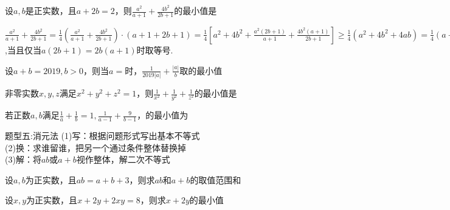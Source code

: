 \documentclass[11pt,a4paper]{ctexbook}
\begin{document}
\par
\begin{problem}
    设$a,b$是正实数，且$a+2b=2$，则$\displaystyle \frac{a^2}{a+1}+\frac{4b^2}{2b+1}$的最小值是
    \begin{jiexi}
        $\displaystyle \frac{a^2}{a+1}+\frac{4b^2}{2b+1}=\frac{1}{4}(\frac{a^2}{a+1}+\frac{4b^2}{2b+1})\cdot(a+1+2b+1)=
        \frac{1}{4}[a^2+4b^2+\frac{a^2(2b+1)}{a+1}+\frac{4b^2(a+1)}{2b+1}]\ge\frac{1}{4}(a^2+4b^2+4ab)=\frac{1}{4}(a+2b)^2=1$,当且仅当$a(2b+1)=2b(a+1)$时取等号.
    \end{jiexi}
\end{problem}

\par
\begin{problem}
    设$a+b=2019,b>0$，则当$a=$时，$\displaystyle \frac{1}{2019|a|}+\frac{|a|}{b}$取的最小值
\end{problem}

\par
\begin{problem}
    非零实数$x,y,z$满足$x^2+y^2+z^2=1$，则$\displaystyle \frac{1}{x^2}+\frac{1}{y^2}+\frac{1}{z^2}$的最小值是
\end{problem}

\par
\begin{problem}
    若正数$a,b$满足$\displaystyle \frac{1}{a}+\frac{1}{b}=1,\frac{1}{a-1}+\frac{9}{b-1}$，的最小值为
\end{problem}



\begin{tcolorbox} 
    \centering
    题型五:消元法
    \tcblower %
    (1)写：根据问题形式写出基本不等式\\
    (2)换：求谁留谁，把另一个通过条件整体替换掉\\
    (3)解：将$ab$或$a+b$视作整体，解二次不等式
\end{tcolorbox}

\par
\begin{problem}
    设$a,b$为正实数，且$ab=a+b+3$，则求$ab$和$a+b$的取值范围\tiankong{$[9,+\infty)$}和\tiankong{$[6,+\infty)$}
\end{problem}

\par
\begin{problem}
    设$x,y$为正实数，且$x+2y+2xy=8$，则求$x+2y$的最小值
\end{problem}
\end{document}
